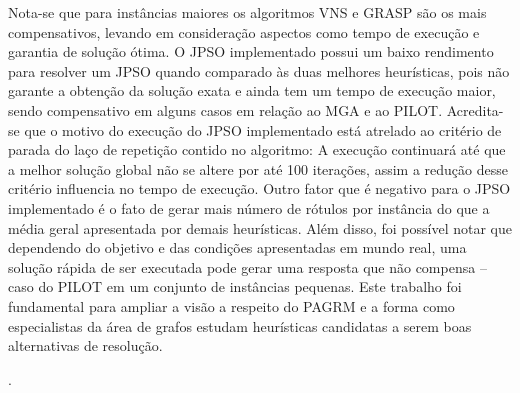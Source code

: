 \documentclass{sig-alternate-05-2015}
\begin{document}
Nota-se que para instâncias maiores os algoritmos VNS e GRASP são os mais compensativos, levando em consideração aspectos como tempo de execução e garantia
de solução ótima. O JPSO implementado possui um baixo rendimento para resolver um JPSO quando comparado às duas melhores heurísticas, pois não garante a obtenção
da solução exata e ainda tem um tempo de execução maior, sendo compensativo em alguns casos em relação ao MGA e ao PILOT.  Acredita-se que o motivo do execução
do JPSO implementado está atrelado ao critério de parada do laço de repetição contido no algoritmo: A execução continuará até que a melhor solução global
não se altere por até 100 iterações, assim a redução desse critério influencia no tempo de execução. Outro fator que é negativo para o JPSO implementado é o fato de gerar mais número de rótulos por instância do que a média geral apresentada por demais heurísticas. Além disso, foi possível notar que dependendo do
objetivo e das condições apresentadas em mundo real, uma solução rápida de ser executada pode gerar uma resposta que não compensa -- caso do PILOT em um conjunto
de instâncias pequenas. Este trabalho foi fundamental para ampliar a visão a respeito do PAGRM e a forma como especialistas da área de grafos estudam heurísticas
candidatas a serem boas alternativas de resolução.

.

%

%
%
\end{document}

